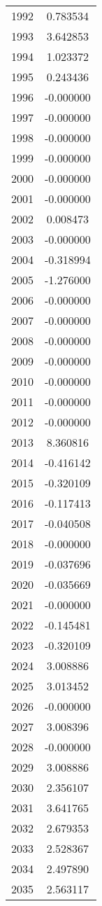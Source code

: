 \documentclass[12pt]{article}
\begin{document}
\begin{longtable}{@{}cc@{}}
1992 & 0.783534 \\
1993 & 3.642853 \\
1994 & 1.023372 \\
1995 & 0.243436 \\
1996 & -0.000000 \\
1997 & -0.000000 \\
1998 & -0.000000 \\
1999 & -0.000000 \\
2000 & -0.000000 \\
2001 & -0.000000 \\
2002 & 0.008473 \\
2003 & -0.000000 \\
2004 & -0.318994 \\
2005 & -1.276000 \\
2006 & -0.000000 \\
2007 & -0.000000 \\
2008 & -0.000000 \\
2009 & -0.000000 \\
2010 & -0.000000 \\
2011 & -0.000000 \\
2012 & -0.000000 \\
2013 & 8.360816 \\
2014 & -0.416142 \\
2015 & -0.320109 \\
2016 & -0.117413 \\
2017 & -0.040508 \\
2018 & -0.000000 \\
2019 & -0.037696 \\
2020 & -0.035669 \\
2021 & -0.000000 \\
2022 & -0.145481 \\
2023 & -0.320109 \\
2024 & 3.008886 \\
2025 & 3.013452 \\
2026 & -0.000000 \\
2027 & 3.008396 \\
2028 & -0.000000 \\
2029 & 3.008886 \\
2030 & 2.356107 \\
2031 & 3.641765 \\
2032 & 2.679353 \\
2033 & 2.528367 \\
2034 & 2.497890 \\
2035 & 2.563117 \\

\end{longtable}
\end{document}
